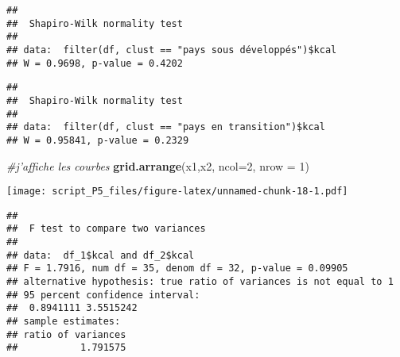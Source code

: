 \documentclass[
]{article}
\newenvironment{Shaded}{\begin{snugshade}}{\end{snugshade}}
\newcommand{\CommentTok}[1]{\textcolor[rgb]{0.56,0.35,0.01}{\textit{#1}}}
\newcommand{\DataTypeTok}[1]{\textcolor[rgb]{0.13,0.29,0.53}{#1}}
\newcommand{\DecValTok}[1]{\textcolor[rgb]{0.00,0.00,0.81}{#1}}
\newcommand{\KeywordTok}[1]{\textcolor[rgb]{0.13,0.29,0.53}{\textbf{#1}}}
\newcommand{\NormalTok}[1]{#1}
\newcommand{\OperatorTok}[1]{\textcolor[rgb]{0.81,0.36,0.00}{\textbf{#1}}}
\newcommand{\StringTok}[1]{\textcolor[rgb]{0.31,0.60,0.02}{#1}}
\begin{document}
\begin{verbatim}
## 
##  Shapiro-Wilk normality test
## 
## data:  filter(df, clust == "pays sous développés")$kcal
## W = 0.9698, p-value = 0.4202
\end{verbatim}

\begin{Shaded}
\end{Shaded}

\begin{verbatim}
## 
##  Shapiro-Wilk normality test
## 
## data:  filter(df, clust == "pays en transition")$kcal
## W = 0.95841, p-value = 0.2329
\end{verbatim}

\begin{Shaded}
\begin{Highlighting}[]
\CommentTok{#j'affiche les courbes}
\KeywordTok{grid.arrange}\NormalTok{(x1,x2, }\DataTypeTok{ncol=}\DecValTok{2}\NormalTok{, }\DataTypeTok{nrow =} \DecValTok{1}\NormalTok{)}
\end{Highlighting}
\end{Shaded}

\texttt{[image: script\_P5\_files/figure-latex/unnamed-chunk-18-1.pdf]}

\begin{Shaded}
\end{Shaded}

\begin{verbatim}
## 
##  F test to compare two variances
## 
## data:  df_1$kcal and df_2$kcal
## F = 1.7916, num df = 35, denom df = 32, p-value = 0.09905
## alternative hypothesis: true ratio of variances is not equal to 1
## 95 percent confidence interval:
##  0.8941111 3.5515242
## sample estimates:
## ratio of variances 
##           1.791575
\end{verbatim}

\begin{Shaded}
\end{Shaded}
\end{document}
